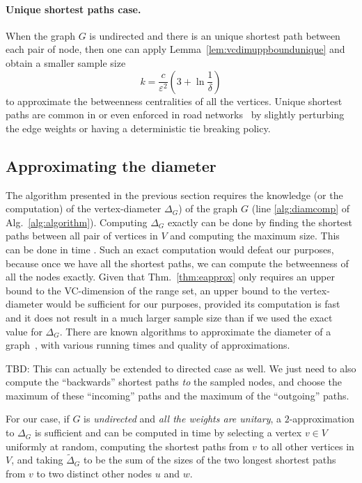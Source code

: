 \paragraph{Unique shortest paths case.} When the graph $G$ is undirected and
there is an unique shortest path between each pair of node, then one can apply
Lemma~\ref{lem:vcdimuppboundunique} and obtain a smaller sample size
\[ k= \frac{c}{\varepsilon^2}\left(3+\ln\frac{1}{\delta}\right)
\]
to approximate the betweenness centralities of all the vertices. Unique shortest
paths are common in or even enforced in road networks~\citep{GeisbergerSS08} by
slightly perturbing the edge weights or having a deterministic tie breaking
policy.

\subsection{Approximating the diameter}\label{sec:diam}
The algorithm presented in the previous section requires the knowledge (or the
computation) of the vertex-diameter $\Delta_G$) of the graph $G$ (line
\ref{alg:diamcomp} of Alg.~\ref{alg:algorithm}). Computing $\Delta_G$ exactly
can be done by finding the shortest paths between all pair of vertices in $V$
and computing the maximum size. This can be done in time \XXX. Such an exact
computation would defeat our purposes, because once we have all the shortest
paths, we can compute the betweenness of all the nodes exactly. Given that
Thm.~\ref{thm:eapprox} only requires an upper bound to the VC-dimension of the
range set, an upper bound to the vertex-diameter would be sufficient for our
purposes, provided its computation is fast and it does not result in a much
larger sample size than if we used the exact value for $\Delta_G$. There are
known algorithms to approximate the diameter of a
graph~\citep{AingwordCIM99,BoitmanisFL06,RodittyW12}, with various running times
and quality of approximations.

\XXX TBD: This can actually be extended to directed case as well. We just need
to also compute the ``backwards'' shortest paths \emph{to} the sampled nodes, and
choose the maximum of these ``incoming'' paths and the maximum of the
``outgoing'' paths. \MR

For our case, if $G$ is \emph{undirected} and \emph{all the weights are
unitary}, a $2$-approximation to $\Delta_G$ is sufficient and can be computed in
time \XXX by selecting a vertex $v\in V$ uniformly at random, computing the
shortest paths from $v$ to all other vertices in $V$, and taking
$\tilde\Delta_G$ to be the sum of the sizes of the two longest shortest paths
from $v$ to two distinct other nodes $u$ and $w$. 


